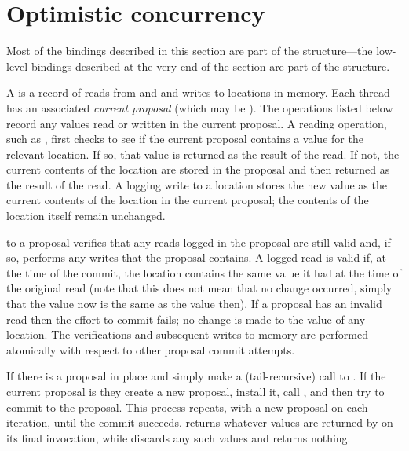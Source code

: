 \section{Optimistic concurrency}
\label{sec:optimistic-concurrency}

Most of the bindings described in this section are part of the 
structure---the low-level bindings described at the very end of the
section are part of the  structure.

A  is a record of reads from and and writes to locations in
 memory.  Each thread has an associated \textit{current proposal}
 (which may be ).
The  operations listed below record any values read or
 written in the current proposal.
A reading operation, such as , first checks to
 see if the current proposal contains a value for the relevant location.
If so, that value is returned as the result of the read.
If not, the current contents of the location are stored in the proposal and
 then returned as the result of the read.
A logging write to a location stores the new value as the current contents of
 the location in the current proposal; the contents of the location itself
 remain unchanged.

 to a proposal verifies that any reads logged in
 the proposal are still valid and, if so, performs any writes that
 the proposal contains.
A logged read is valid if, at the time of the commit, the location contains
 the same value it had at the time of the original read (note that this does
 not mean that no change occurred, simply that the value now is the same as
 the value then).
If a proposal has an invalid read then the effort to commit fails; no change
 is made to the value of any location.
The verifications and subsequent writes to memory are performed atomically
 with respect to other proposal commit attempts.

\begin{protos}
\end{protos}
\noindent
If there is a proposal in place 
  and 
 simply make a (tail-recursive) call to .
If the current proposal is  they create a new proposal,
 install it, call , and then try to commit to the proposal.
This process repeats, with a new proposal on each iteration, until
 the commit succeeds.
 returns whatever values are returned by 
 on its final invocation, while  discards any such
 values and returns nothing.

